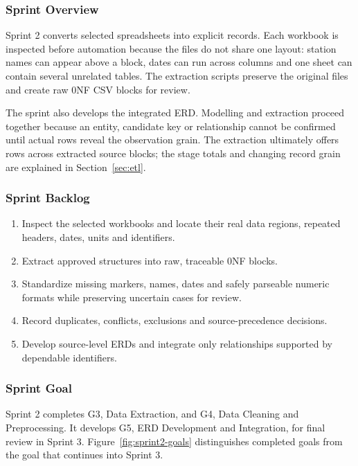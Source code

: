 \subsubsection{Sprint Overview}

Sprint 2 converts selected spreadsheets into explicit records. Each workbook
is inspected before automation because the files do not share one layout:
station names can appear above a block, dates can run across columns and one
sheet can contain several unrelated tables. The extraction scripts preserve
the original files and create raw 0NF CSV blocks for review.

The sprint also develops the integrated ERD. Modelling and extraction proceed
together because an entity, candidate key or relationship cannot be confirmed
until actual rows reveal the observation grain. The extraction ultimately
offers \mRowsOffered{} rows across \mSourceBlocks{} extracted source blocks;
the stage totals and changing record grain are explained in
Section~\ref{sec:etl}.

\subsubsection{Sprint Backlog}

\begin{enumerate}[leftmargin=*]
  \item Inspect the selected workbooks and locate their real data regions,
  repeated headers, dates, units and identifiers.
  \item Extract approved structures into raw, traceable 0NF blocks.
  \item Standardize missing markers, names, dates and safely parseable numeric
  formats while preserving uncertain cases for review.
  \item Record duplicates, conflicts, exclusions and source-precedence
  decisions.
  \item Develop source-level ERDs and integrate only relationships supported by
  dependable identifiers.
\end{enumerate}

\subsubsection{Sprint Goal}

Sprint 2 completes G3, Data Extraction, and G4, Data Cleaning and
Preprocessing. It develops G5, ERD Development and Integration, for final
review in Sprint 3.
Figure~\ref{fig:sprint2-goals} distinguishes completed goals from the goal that
continues into Sprint 3.

